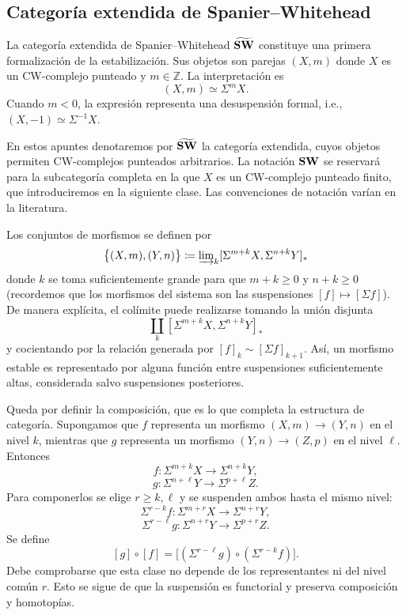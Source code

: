 \subsection{Categoría extendida de Spanier--Whitehead}

La categoría extendida de Spanier--Whitehead $\widetilde{\mathbf{SW}}$ constituye una primera formalización de la estabilización.
Sus objetos son parejas $(X,m)$ donde \(X\) es un CW-complejo punteado y \(m\in\mathbb Z\). La interpretación es
\[
(X,m)\simeq\Sigma^mX.
\]
Cuando \(m<0\), la expresión representa una desuspensión formal, i.e., $(X,-1)\simeq\Sigma^{-1}X$.

\begin{nota}
En estos apuntes denotaremos por \(\widetilde{\mathbf{SW}}\) la categoría extendida, cuyos objetos permiten CW-complejos punteados arbitrarios. La notación \(\mathbf{SW}\) se reservará para la subcategoría completa en la que \(X\) es un CW-complejo punteado finito, que introduciremos en la siguiente clase. Las convenciones de notación varían en la literatura.
\end{nota}

Los conjuntos de morfismos se definen por
\[
\bigl\{(X,m),(Y,n)\bigr\}\coloneqq \varinjlim\nolimits_k [\Sigma^{m+k}X,\Sigma^{n+k}Y]_*
\]
donde \(k\) se toma suficientemente grande para que \(m+k\ge0\) y \(n+k\ge0\)
(recordemos que los morfismos del sistema son las suspensiones $[f]\longmapsto[\Sigma f]$).
De manera explícita, el colímite puede realizarse tomando la unión disjunta
\[
\coprod_k [\Sigma^{m+k}X,\Sigma^{n+k}Y]_*
\]
y cocientando por la relación generada por $[f]_k\sim[\Sigma f]_{k+1}$.
Así, un morfismo estable es representado por alguna función entre suspensiones suficientemente altas, considerada salvo suspensiones posteriores.

Queda por definir la composición, que es lo que completa la estructura de categoría. Supongamos que \(f\) representa un morfismo \((X,m)\longrightarrow(Y,n)\) en el nivel \(k\), mientras que \(g\) representa un morfismo \((Y,n)\longrightarrow(Z,p)\) en el nivel \(\ell\). Entonces
\[
f\colon\Sigma^{m+k}X\to\Sigma^{n+k}Y,
\]
\[
g\colon\Sigma^{n+\ell}Y\to\Sigma^{p+\ell}Z.
\]
Para componerlos se elige \(r\ge k,\ell\) y se suspenden ambos hasta el mismo nivel:
\[
\Sigma^{r-k}f\colon\Sigma^{m+r}X\longrightarrow\Sigma^{n+r}Y,
\]
\[
\Sigma^{r-\ell}g\colon\Sigma^{n+r}Y\longrightarrow\Sigma^{p+r}Z.
\]
Se define
\[
[g]\circ[f]=\bigl[(\Sigma^{r-\ell}g)\circ(\Sigma^{r-k}f)\bigr].
\]
Debe comprobarse que esta clase no depende de los representantes ni del nivel común \(r\). Esto se sigue de que la suspensión es functorial y preserva composición y homotopías.


